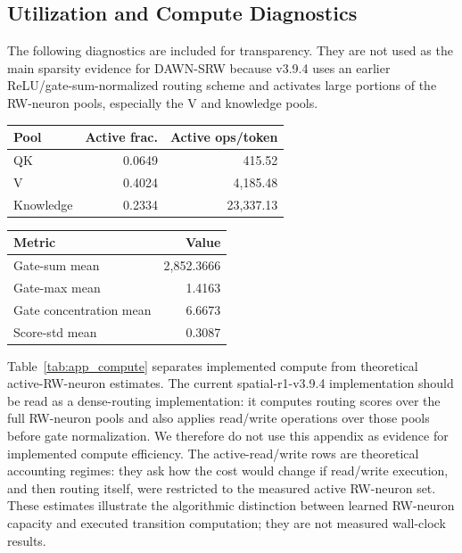 \documentclass{article}
\begin{document}
\subsection{Utilization and Compute Diagnostics}

The following diagnostics are included for transparency. They are not used as the main sparsity evidence for DAWN-SRW because v3.9.4 uses an earlier ReLU/gate-sum-normalized routing scheme and activates large portions of the RW-neuron pools, especially the V and knowledge pools.

\begin{center}
\small
\begin{minipage}{0.46\textwidth}
\centering
\setlength{\tabcolsep}{7pt}
\begin{tabular}{lrr}
\toprule
Pool & Active frac. & Active ops/token \\
\midrule
QK & 0.0649 & 415.52 \\
V & 0.4024 & 4{,}185.48 \\
Knowledge & 0.2334 & 23{,}337.13 \\
\bottomrule
\end{tabular}
\label{tab:app_utilization}
\end{minipage}\hfill
\begin{minipage}{0.46\textwidth}
\centering
\setlength{\tabcolsep}{7pt}
\begin{tabular}{lr}
\toprule
Metric & Value \\
\midrule
Gate-sum mean & 2{,}852.3666 \\
Gate-max mean & 1.4163 \\
Gate concentration mean & 6.6673 \\
Score-std mean & 0.3087 \\
\bottomrule
\end{tabular}
\label{tab:app_routing_diagnostics}
\end{minipage}
\end{center}

Table~\ref{tab:app_compute} separates implemented compute from theoretical active-RW-neuron estimates. The current spatial-r1-v3.9.4 implementation should be read as a dense-routing implementation: it computes routing scores over the full RW-neuron pools and also applies read/write operations over those pools before gate normalization. We therefore do not use this appendix as evidence for implemented compute efficiency. The active-read/write rows are theoretical accounting regimes: they ask how the cost would change if read/write execution, and then routing itself, were restricted to the measured active RW-neuron set. These estimates illustrate the algorithmic distinction between learned RW-neuron capacity and executed transition computation; they are not measured wall-clock results.
\end{document}
